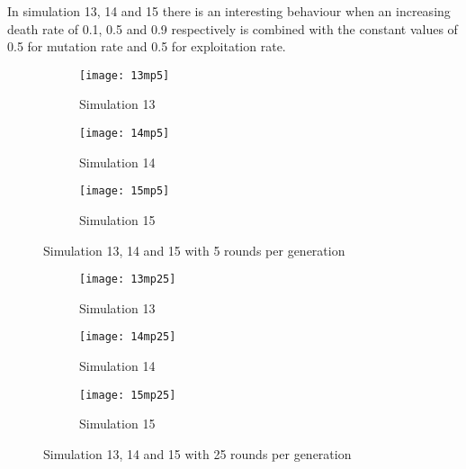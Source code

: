 In simulation 13, 14 and 15  there is an interesting behaviour when an increasing death rate of 0.1, 0.5 and 0.9 respectively is combined with the constant values of 0.5 for mutation rate and 0.5 for exploitation rate.

\begin{figure}[H]       
    \centering
    \begin{subfigure}[b]{0.3\textwidth}
	\centering
	{\texttt{[image: 13mp5]}}   
    	\caption{Simulation 13}
	\label{fig:mpsim135}
    \end{subfigure}
    \hfill
    \begin{subfigure}[b]{0.3\textwidth}
	\centering
	{\texttt{[image: 14mp5]}}   
    	\caption{Simulation 14}
	\label{fig:mpsim145}
    \end{subfigure}
    \hfill
    \begin{subfigure}[b]{0.3\textwidth}
	\centering
	{\texttt{[image: 15mp5]}}   
    	\caption{Simulation 15}
	\label{fig:mpsim155}
    \end{subfigure}
    \caption{Simulation 13, 14 and 15 with 5 rounds per generation}
    \label{mpsim131415simulations5}
\end{figure}

\begin{figure}[H]       
    \centering
    \begin{subfigure}[b]{0.3\textwidth}
	\centering
	{\texttt{[image: 13mp25]}}   
    	\caption{Simulation 13}
	\label{fig:mpsim1325}
    \end{subfigure}
    \hfill
    \begin{subfigure}[b]{0.3\textwidth}
	\centering
	{\texttt{[image: 14mp25]}}   
    	\caption{Simulation 14}
	\label{fig:mpsim1425}
    \end{subfigure}
    \hfill
    \begin{subfigure}[b]{0.3\textwidth}
	\centering
	{\texttt{[image: 15mp25]}}   
    	\caption{Simulation 15}
	\label{fig:mpsim1525}
    \end{subfigure}
    \caption{Simulation 13, 14 and 15 with 25 rounds per generation}
    \label{mpsim131415simulations25}
\end{figure}

